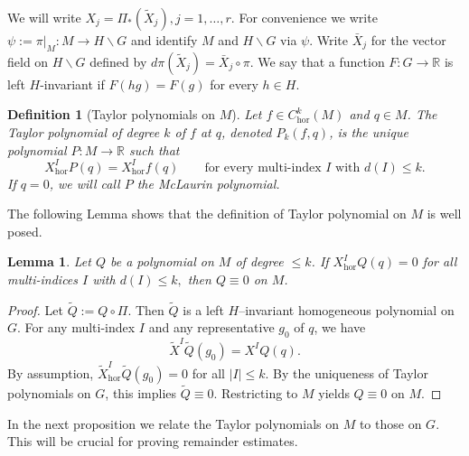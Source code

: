 \documentclass[12pt]{amsart}
\newtheorem{lemma}{Lemma}[section]
\newtheorem{definition}{Definition}[section]
\begin{document}
We will write $X_j = \Pi_*(\tilde X_j), j=1,\dots,r$.
For convenience we write  
\(\psi:=\pi|_M:M\to H\backslash G\) and identify \(M\) and \(H\backslash G\) via \(\psi\).
Write \(\bar X_j\) for the vector field on \(H\backslash G\) defined by 
$
d\pi(\tilde X_j) = \bar X_j\circ\pi.
$
We say that a function $F:G\to \mathbb R$ is left $H$-invariant if $F(hg)=F(g)$ for every $h\in H$.

\begin{definition}[Taylor polynomials on \(M\)]
\label{def:intrinsic-taylor}
Let \(f\in C_{\mathrm{hor}}^{k}(M)\) and \(q\in M\).  
The {Taylor polynomial of degree \(k\)} of \(f\) at \(q\), denoted \(P_{k}(f,q)\), is the unique polynomial \(P:M\to\mathbb R\)  such that
\[
X_{\mathrm{hor}}^I P(q) = X_{\mathrm{hor}}^I f(q)
\qquad\text{for every multi-index }I\text{ with }d(I)\le k.
\]
If $q=0$, we will call $P$ the McLaurin polynomial.
\end{definition}
The following Lemma shows that the definition of Taylor polynomial on $M$ is well posed.
\begin{lemma}
\label{lem:unique-intrinsic}
Let $Q$ be a  polynomial on $M$ of degree $\le k$.
If
\(
X_{\mathrm{hor}}^I Q(q)=0\) for all multi-indices  \(I\) with  \(d(I)\le k,
\)
then $Q\equiv 0$ on $M$.
\end{lemma}

\begin{proof}
Let $\tilde Q := Q\circ \Pi$.
Then $\tilde Q$ is a left $H$--invariant homogeneous polynomial on $G$.
For any multi-index $I$ and any representative $g_0$ of $q$, we have
\[
\tilde X^I \tilde Q(g_0) = X^I Q(q).
\]
By assumption, $\tilde X_{\mathrm{hor}}^I \tilde Q(g_0)=0$ for all $|I|\le k$.
By the uniqueness of Taylor polynomials on $G$, this implies $\tilde Q\equiv 0$.
Restricting to $M$ yields $Q\equiv 0$ on $M$.
\end{proof}

In the next proposition we relate the Taylor polynomials on $M$ to those on $G$. This will be crucial for proving remainder estimates.
\end{document}

